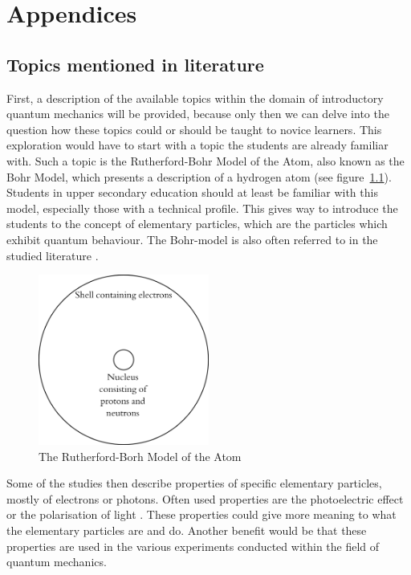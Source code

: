 \documentclass[11pt,twoside]{report} %
\begin{document}



\part{Appendices}

\appendix

\chapter{Topics mentioned in literature}
\label{app:topicsliterature}

First, a description of the available topics within the domain of introductory quantum mechanics will be provided, because only then we can delve into the question how these topics could or should be taught to novice learners. This exploration would have to start with a topic the students are already familiar with. Such a topic is the Rutherford-Bohr Model of the Atom, also known as the Bohr Model, which presents a description of a hydrogen atom (see figure~\ref{fig:bohrmodel}). Students in upper secondary education should at least be familiar with this model, especially those with a technical profile. This gives way to introduce the students to the concept of elementary particles, which are the particles which exhibit quantum behaviour. The Bohr-model is also often referred to in the studied literature \cite{dori, mckagan, muller, papaphotis1, papaphotis2}.

\begin{figure}[h!]
\centering
\includegraphics[width=0.5\textwidth]{bohrmodel}
\caption{The Rutherford-Borh Model of the Atom}
\label{fig:bohrmodel}
\end{figure}

Some of the studies \cite{erduran, hubber, muller, thacker} then describe properties of specific elementary particles, mostly of electrons or photons. Often used properties are the photoelectric effect or the polarisation of light \cite{henriksen, mckagan, muller}. These properties could give more meaning to what the elementary particles are and do. Another benefit would be that these properties are used in the various experiments conducted within the field of quantum mechanics.
\end{document}
